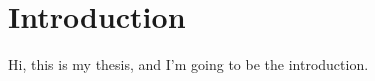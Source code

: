 \chapter{Introduction}\label{chapter:introduction}
Hi, this is my thesis, and I'm going to be the introduction.